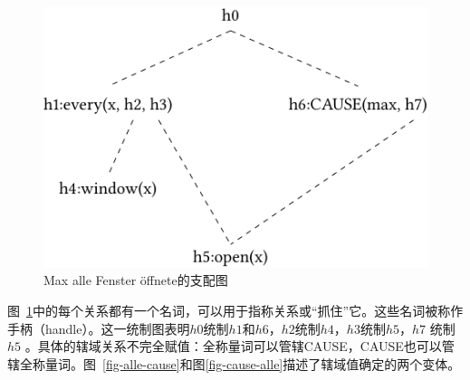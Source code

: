 \begin{figure}
\centering
\includegraphics{Figures/max-alle-fenster-oeffnete-mrs-cropped.pdf}
\caption{Max alle Fenster öffnete的支配图\label{Abbildung-Max-alle-Fenster-oeffnete}}
\end{figure}%
图~\ref{Abbildung-Max-alle-Fenster-oeffnete}中的每个关系都有一个名词，可以用于指称关系或“抓住”它。这些名词被称作手柄（handle）。这一统制图表明$h0$统制$h1$和$h6$，$h2$统制$h4$，$h3$统制$h5$，$h7$ 统制$h5$ 。具体的辖域关系不完全赋值：全称量词可以管辖CAUSE，CAUSE也可以管辖全称量词。图~\ref{fig-alle-cause}和图\ref{fig-cause-alle}描述了辖域值确定的两个变体。
